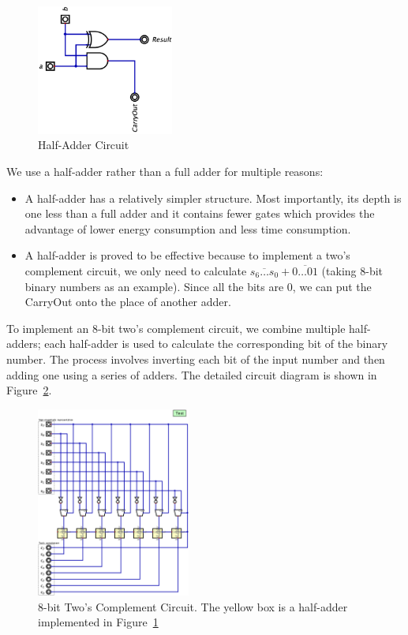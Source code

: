 \documentclass[conference]{IEEEtran}
\begin{document}
\begin{figure}[h!]
\centering
\includegraphics[width=0.4\textwidth]{assets/half_adder.png}
\caption{Half-Adder Circuit}
\label{fig:half_adder}
\end{figure}

We use a half-adder rather than a full adder for multiple reasons:
\begin{itemize}
    \item A half-adder has a relatively simpler structure. Most importantly, its depth is one less than a full adder and it contains fewer gates which provides the advantage of lower energy consumption and less time consumption.
    \item A half-adder is proved to be effective because to implement a two's complement circuit, we only need to calculate $\overline{s_6 \dots s_0} + \overline{0 \dots 01}$ (taking 8-bit binary numbers as an example). Since all the 
    bits are 0, we can put the CarryOut onto the place of another adder.
\end{itemize}

To implement an 8-bit two's complement circuit, we combine multiple half-adders; each half-adder is used to calculate the corresponding bit of the binary number. The process involves inverting each bit of the input number and then adding one using a series of adders. The detailed circuit diagram is shown in Figure~\ref{fig:twos_complement}.



\begin{figure}[h!]
\centering
\includegraphics[width=0.45\textwidth]{assets/twos_complement.png}
\caption{8-bit Two's Complement Circuit. The yellow box is a half-adder implemented in Figure~\ref{fig:half_adder}}
\label{fig:twos_complement}
\end{figure}
\end{document}
